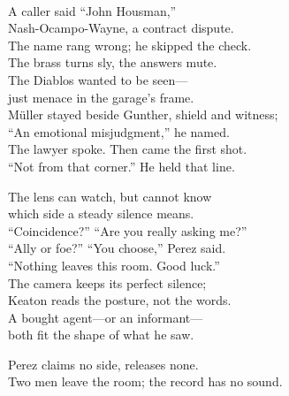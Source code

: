 \begin{lyrics}
\\
A caller said “John Housman,”\\
Nash-Ocampo-Wayne, a contract dispute.\\
The name rang wrong; he skipped the check.\\
The brass turns sly, the answers mute.\\
The Diablos wanted to be seen—\\
just menace in the garage’s frame.\\
Müller stayed beside Gunther, shield and witness;\\
“An emotional misjudgment,” he named.\\
The lawyer spoke. Then came the first shot.\\
“Not from that corner.” He held that line.

The lens can watch, but cannot know\\
which side a steady silence means.\\
“Coincidence?” “Are you really asking me?”\\
“Ally or foe?” “You choose,” Perez said.\\
“Nothing leaves this room. Good luck.”\\
The camera keeps its perfect silence;\\
Keaton reads the posture, not the words.\\
A bought agent—or an informant—\\
both fit the shape of what he saw.

Perez claims no side, releases none.\\
Two men leave the room; the record has no sound.
\end{lyrics}

